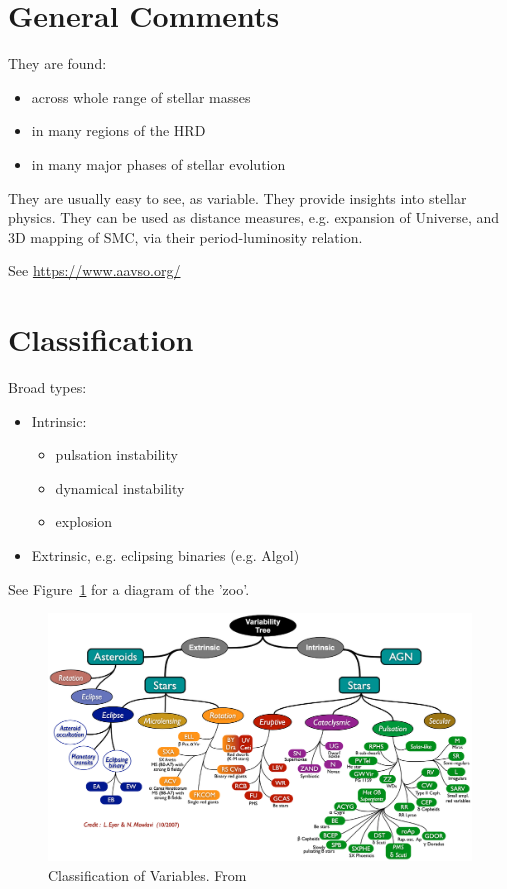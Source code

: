 \documentclass{spy}
\begin{document}
\tableofcontents

\section{General Comments}
They are found:
\begin{itemize}
    \item across whole range of stellar masses
    \item in many regions of the HRD
    \item in many major phases of stellar evolution
\end{itemize}

They are usually easy to see, as variable.
They provide insights into stellar physics.
They can be used as distance measures, e.g. expansion of Universe, and 3D mapping of SMC, via their period-luminosity relation.


See \url{https://www.aavso.org/}

\section{Classification}
Broad types:
\begin{itemize}
\item Intrinsic:
    \begin{itemize}
    \item pulsation instability
    \item dynamical instability
    \item explosion
    \end{itemize}
\item Extrinsic, e.g. eclipsing binaries (e.g. Algol)
\end{itemize}

See Figure~\ref{variable_classes_diagram} for a diagram of the 'zoo'. 

\begin{figure}[ht]
    \centering
    \includegraphics[width=\textwidth]{variable_classes.eps}
    \caption{Classification of Variables. From \citet{eyerVariableStarsObservational2008}}
    \label{variable_classes_diagram}
\end{figure}
\end{document}
